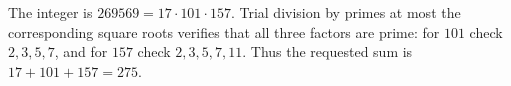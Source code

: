 The integer is $269569=17\cdot101\cdot157$. Trial division by primes at most the corresponding square roots verifies that all three factors are prime: for $101$ check $2,3,5,7$, and for $157$ check $2,3,5,7,11$. Thus the requested sum is $17+101+157=\boxed{275}$.
